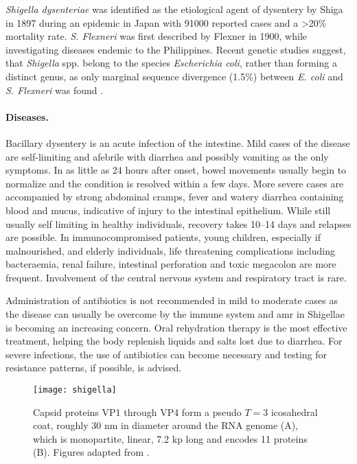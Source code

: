 \textit{Shigella dysenteriae} was identified as the etiological agent of dysentery by Shiga in 1897 during an epidemic in Japan with 91000 reported cases and a \textgreater 20\% mortality rate. \textit{S. Flexneri} was first described by Flexner in 1900, while investigating diseases endemic to the Philippines. Recent genetic studies suggest, that \textit{Shigella} spp. belong to the species \textit{Escherichia coli}, rather than forming a distinct genus, as only marginal sequence divergence (1.5\%) between \textit{E. coli} and \textit{S. Flexneri} was found \citep{Schroeder2008}.

\paragraph{Diseases.}
Bacillary dysentery is an acute infection of the intestine. Mild cases of the disease are self-limiting and afebrile with diarrhea and possibly vomiting as the only symptoms. In as little as 24 hours after onset, bowel movements usually begin to normalize and the condition is resolved within a few days. More severe cases are accompanied by strong abdominal cramps, fever and watery diarrhea containing blood and mucus, indicative of injury to the intestinal epithelium. While still usually self limiting in healthy individuals, recovery takes 10--14 days and relapses are possible. In immunocompromised patients, young children, especially if malnourished, and elderly individuals, life threatening complications including bacteraemia, renal failure, intestinal perforation and toxic megacolon are more frequent. Involvement of the central nervous system and respiratory tract is rare.

Administration of antibiotics is not recommended in mild to moderate cases as the disease can usually be overcome by the immune system and \gls{amr} in Shigellae is becoming an increasing concern. Oral rehydration therapy is the most effective treatment, helping the body replenish liquids and salts lost due to diarrhea. For severe infections, the use of antibiotics can become necessary and testing for resistance patterns, if possible, is advised.

\begin{figure}
  \centering
  \texttt{[image: shigella]}
  \caption[Capsid structure and genome of rhinoviruses.]{Capsid proteins VP1 through VP4 form a pseudo $T=3$ icosahedral coat, roughly 30 nm in diameter around the RNA genome (A), which is monopartite, linear, 7.2 kp long and encodes 11 proteins (B). Figures adapted from \cite{Croxen2010}.}
  \label{fig:shigella}
\end{figure}

